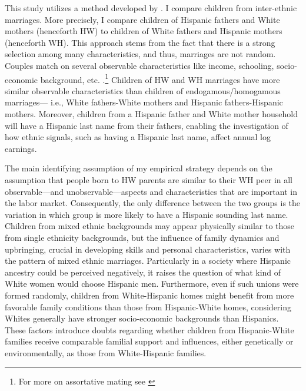 This study utilizes a method developed by \textcite{rubinstein2014pride}. I compare children from inter-ethnic marriages. More precisely, I compare children of Hispanic fathers and White mothers (henceforth HW) to children of White fathers and Hispanic mothers (henceforth  WH). This approach stems from the fact that there is a strong selection among many characteristics, and thus, marriages are not random. Couples match on several observable characteristics like income, schooling, socio-economic background, etc. \autocite{averettBetterWorseRelationship2008, averettEconomicRealityBeauty1996}.\footnote{For more on assortative mating see \autocite{beckerTheoryMarriagePart1973, beckerTheoryMarriagePart1974, beckerTreatiseFamily1993, browningCollectiveUnitaryModels2006, chiapporiFatterAttractionAnthropometric2012}} Children of HW and WH marriages have more similar observable characteristics than children of endogamous/homogamous marriages--- i.e., White fathers-White mothers and Hispanic fathers-Hispanic mothers. Moreover, children from a Hispanic father and White mother household will have a Hispanic last name from their fathers, enabling the investigation of how ethnic signals, such as having a Hispanic last name, affect annual log earnings.

The main identifying assumption of my empirical strategy depends on the assumption that people born to HW parents are similar to their WH peer in all observable---and unobservable---aspects and characteristics that are important in the labor market. Consequently, the only difference between the two groups is the variation in which group is more likely to have a Hispanic sounding last name. Children from mixed ethnic backgrounds may appear physically similar to those from single ethnicity backgrounds, but the influence of family dynamics and upbringing, crucial in developing skills and personal characteristics, varies with the pattern of mixed ethnic marriages. Particularly in a society where Hispanic ancestry could be perceived negatively, it raises the question of what kind of White women would choose Hispanic men. Furthermore, even if such unions were formed randomly, children from White-Hispanic homes might benefit from more favorable family conditions than those from Hispanic-White homes, considering Whites generally have stronger socio-economic backgrounds than Hispanics. These factors introduce doubts regarding whether children from Hispanic-White families receive comparable familial support and influences, either genetically or environmentally, as those from White-Hispanic families.

